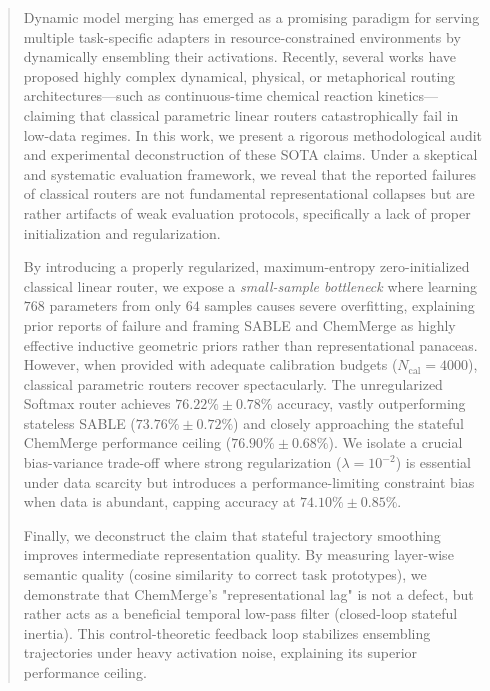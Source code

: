 \begin{abstract}
Dynamic model merging has emerged as a promising paradigm for serving multiple
task-specific adapters in resource-constrained environments by dynamically ensembling
their activations. Recently, several works have proposed highly complex dynamical,
physical, or metaphorical routing architectures---such as continuous-time chemical
reaction kinetics---claiming that classical parametric linear routers catastrophically
fail in low-data regimes. In this work, we present a rigorous methodological audit
and experimental deconstruction of these SOTA claims. Under a skeptical and systematic
evaluation framework, we reveal that the reported failures of classical routers are not
fundamental representational collapses but are rather artifacts of weak evaluation
protocols, specifically a lack of proper initialization and regularization.

By introducing a properly regularized, maximum-entropy zero-initialized classical
linear router, we expose a \emph{small-sample bottleneck} where learning $768$
parameters from only $64$ samples causes severe overfitting, explaining prior
reports of failure and framing SABLE and ChemMerge as highly effective inductive geometric
priors rather than representational panaceas. However, when provided with adequate
calibration budgets ($N_{\text{cal}} = 4000$), classical parametric routers recover
spectacularly. The unregularized Softmax router achieves $76.22\% \pm 0.78\%$ accuracy,
vastly outperforming stateless SABLE ($73.76\% \pm 0.72\%$) and closely approaching the
stateful ChemMerge performance ceiling ($76.90\% \pm 0.68\%$). We isolate a crucial
bias-variance trade-off where strong regularization ($\lambda=10^{-2}$) is essential
under data scarcity but introduces a performance-limiting constraint bias when data is
abundant, capping accuracy at $74.10\% \pm 0.85\%$.

Finally, we deconstruct the claim that stateful trajectory smoothing improves intermediate
representation quality. By measuring layer-wise semantic quality (cosine similarity to correct
task prototypes), we demonstrate that ChemMerge's "representational lag" is not a defect,
but rather acts as a beneficial temporal low-pass filter (closed-loop stateful inertia).
This control-theoretic feedback loop stabilizes ensembling trajectories under heavy activation
noise, explaining its superior performance ceiling.
\end{abstract}